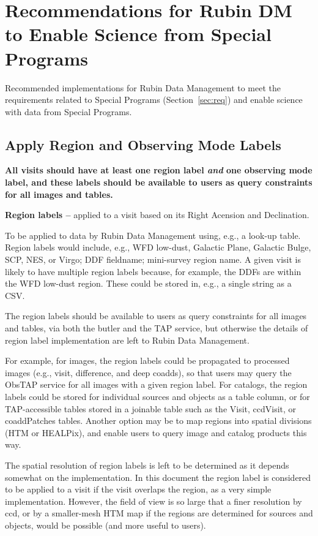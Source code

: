 \section{Recommendations for Rubin DM to Enable Science from Special Programs}\label{sec:sci}

Recommended implementations for Rubin Data Management to meet the 
requirements related to Special Programs (Section~\ref{sec:req})
and enable science with data from Special Programs.

\subsection{Apply Region and Observing Mode Labels}\label{ssec:sci_labels}

\textbf{All visits should have at least one region label \textit{and} one observing mode 
label, and these labels should be available to users as query constraints for
all images and tables.}

\textbf{Region labels -- } 
applied to a visit based on its Right Acension and Declination.

To be applied to data by Rubin Data Management using, e.g., a look-up table.
Region labels would include, e.g., WFD low-dust, Galactic Plane, Galactic 
Bulge, SCP, NES, or Virgo; DDF fieldname; mini-survey region name.
A given visit is likely to have multiple region labels because, for example,
the DDFs are within the WFD low-dust region.
These could be stored in, e.g., a single string as a CSV.

The region labels should be available to users as query constraints for
all images and tables, via both the butler and the TAP service, but otherwise
the details of region label implementation are left to Rubin Data Management.

For example, for images, the region labels could be propagated to processed images
(e.g., visit, difference, and deep coadds), so that users may query the ObsTAP 
service for all images with a given region label.
For catalogs, the region labels could be stored for individual sources and
objects as a table column, or for TAP-accessible tables stored in a joinable
table such as the Visit, ccdVisit, or coaddPatches tables.
Another option may be to map regions into spatial divisions (HTM or HEALPix),
and enable users to query image and catalog products this way.

The spatial resolution of region labels is left to be determined as it depends
somewhat on the implementation.
In this document the region label is considered to be applied to a visit
if the visit overlaps the region, as a very simple implementation.
However, the field of view is so large that a finer resolution by ccd,
or by a smaller-mesh HTM map if the regions are determined for sources and objects,
would be possible (and more useful to users).

